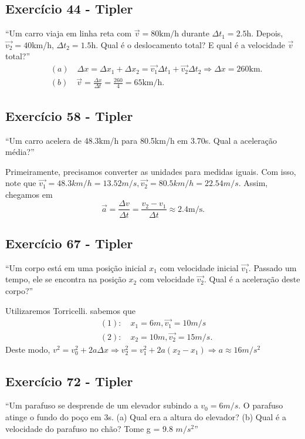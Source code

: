 \documentclass{article}
\begin{document}
\subsection{Exerc\'icio 44 - Tipler}
``Um carro viaja em linha reta com $\vec{v} = 80\text{km/h} $ durante $\Delta t_{1}=2.5$h. Depois, $\vec{v_{2}} = 40$km/h, $\Delta t_{2} = 1.5$h. Qual
\'e o deslocamento total? E qual \'e a velocidade $\vec{v}$ total?''
\begin{align*}
  &(a)\quad \Delta x = \Delta x_{1} + \Delta x_{2} = \vec{v_{1}}\Delta t_{1} + \vec{v_{2}}\Delta t_{2}  \Rightarrow \Delta x = 260\text{km.}\\
  &(b)\quad \vec{v} = \frac{\Delta x}{\Delta t} = \frac{260}{4} = 65\text{km/h}.
\end{align*}

\subsection{Exerc\'icio 58 - Tipler}
  ``Um carro acelera de 48.3km/h para 80.5km/h em 3.70s. Qual a acelera\c c\~ao m\'edia?''

Primeiramente, precisamos converter as unidades para medidas iguais. Com isso, note que $\vec{v_1} = 48.3km/h = 13.52m/s, \vec{v_{2}} = 80.5km/h = 22.54m/s$. Assim,
chegamos em 
  $$
  \vec{a} = \frac{\Delta v}{\Delta t} = \frac{v_{2} - v_{1}}{\Delta t}\approx 2.4\text{m/s}.
  $$

\subsection{Exerc\'icio 67 - Tipler}
``Um corpo est\'a em uma posi\c c\~ao inicial $x_{1}$ com velocidade inicial $\vec{v_{1}}$. Passado um tempo, ele se encontra na posi\c c\~ao $x_{2}$ com velocidade $\vec{v_{2}}$. Qual \'e a acelera\c c\~ao deste corpo?''

Utilizaremos Torricelli. sabemos que 
 \begin{align*}
   &(1):\quad x_{1} = 6m, \vec{v_{1}} = 10m/s\\
   &(2):\quad x_{2} = 10m, \vec{v_{2}} = 15m/s.
 \end{align*}
 Deste modo, $v^{2} = v_{0}^{2} + 2a\Delta x \Rightarrow v_{2}^{2} = v_{1}^{2} + 2a(x_{2} - x_{1}) \Rightarrow a \approx 16m/s^{2}$

\subsection{Exerc\'icio 72 - Tipler}
  ``Um parafuso se desprende de um elevador subindo a $v_{0} = 6m/s$. O parafuso atinge o fundo do po\c co em 3s. (a) Qual era a altura do elevador? (b) Qual \'e a velocidade do parafuso no ch\~ao? Tome g = 9.8 $m/s^{2}$''
\end{document}
